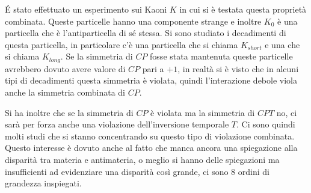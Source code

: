 \'E stato effettuato un esperimento sui Kaoni $K$ in cui si è testata questa proprietà combinata.
Queste particelle hanno una componente strange e inoltre $K_0$ è una particella che è l'antiparticella di sé stessa.
Si sono studiato i decadimenti di questa particella, in particolare c'è una particella che si chiama $K_{short}$ e una che si chiama $K_{long}$.
Se la simmetria di $CP$ fosse stata mantenuta queste particelle avrebbero dovuto avere valore di $CP$ pari a $+1$, in realtà si è visto che in alcuni tipi di decadimenti questa simmetria è violata, quindi l'interazione debole viola anche la simmetria combinata di $CP$.

Si ha inoltre che se la simmetria di $CP$ è violata ma la simmetria di $CPT$ no, ci sarà per forza anche una violazione dell'inversione temporale $T$.
Ci sono quindi molti studi che si stanno concentrando su questo tipo di violazione combinata.
Questo interesse è dovuto anche al fatto che manca ancora una spiegazione alla disparità tra materia e antimateria, o meglio si hanno delle spiegazioni ma insufficienti ad evidenziare una disparità così grande, ci sono 8 ordini di grandezza inspiegati.